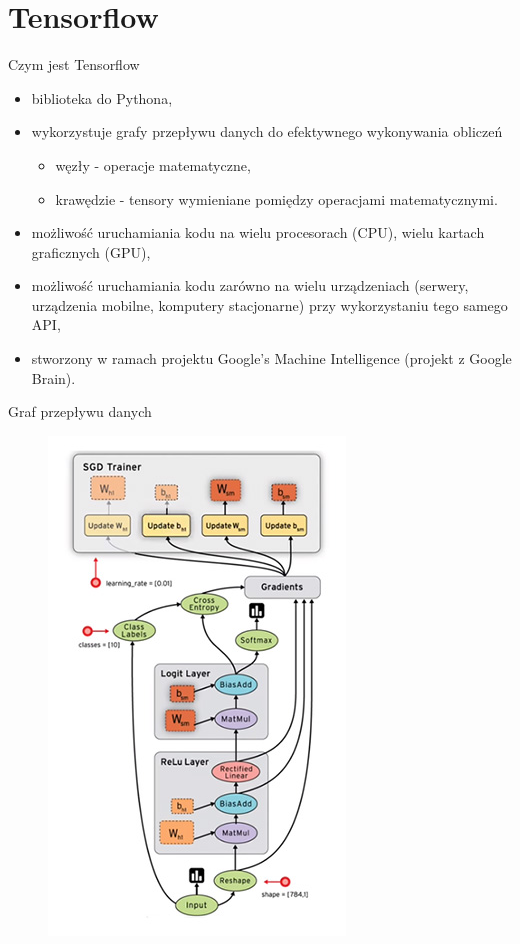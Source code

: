 \documentclass[xcolor=dvipsnames]{beamer}
\begin{document}
\section{Tensorflow}
\begin{frame}{Czym jest Tensorflow}
	\begin{itemize}
		\item biblioteka do Pythona,
		\item wykorzystuje grafy przepływu danych do efektywnego wykonywania obliczeń
		\begin{itemize}
			\item węzły - operacje matematyczne,
			\item krawędzie - tensory wymieniane pomiędzy operacjami matematycznymi.
		\end{itemize}
		\item możliwość uruchamiania kodu na wielu procesorach (CPU), wielu kartach graficznych (GPU),
		\item możliwość uruchamiania kodu zarówno na wielu urządzeniach (serwery, urządzenia mobilne,
		komputery stacjonarne) przy wykorzystaniu tego samego API,
		\item stworzony w ramach projektu Google's Machine Intelligence (projekt z Google Brain).
	\end{itemize}
\end{frame}
\begin{frame}{Graf przepływu danych}
	\begin{figure}
		\includegraphics[height=0.85\textheight, keepaspectratio] {img/data-flow-graph.jpg}
	\end{figure}
\end{frame}
\end{document}
